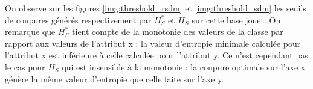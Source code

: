 \documentclass[a4paper]{article}
\begin{document}
On observe sur les figures \ref{img:threshold_rsdm} et \ref{img:threshold_sdm}
les seuils de coupures générés respectivement par $H^*_S$ et $H_S$ sur cette
base jouet. On remarque que $H^*_S$ tient compte de la monotonie des valeurs de
la classe par rapport aux valeurs de l'attribut x : la valeur d'entropie
minimale calculée pour l'attribut x est inférieure à celle calculée pour
l'attribut y. Ce n'est cependant pas le cas pour $H_S$ qui est insensible à la
monotonie : la coupure optimale sur l'axe x génère la même valeur d'entropie que
celle faite sur l'axe y.


\printbibliography
\end{document}
